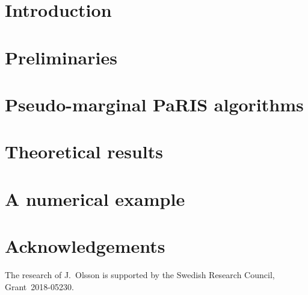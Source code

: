 \documentclass[bj]{imsart}
\numberwithin{equation}{section}
\theoremstyle{remark}
\begin{document}
\section{Introduction}
\label{sec:introduction}


\section{Preliminaries}
\label{sec:preliminaries}


\section{Pseudo-marginal PaRIS algorithms}
\label{sec:pseudo:marginal:PaRIS}


\section{Theoretical results}
\label{sec:theoretical:results}


\section{A numerical example}
\label{sec:numerical:results}




%


\section*{Acknowledgements}

The research of J.~Olsson is supported by the Swedish Research Council, Grant~2018-05230.  




\newpage 

\end{document}
